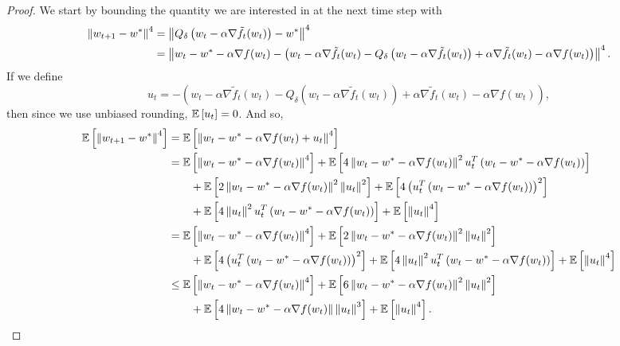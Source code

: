 \begin{proof}
We start by bounding the quantity we are interested in at the next time step with
\begin{align*}
  \left\| w_{t+1} - w^* \right\|^4
  &=
  \left\| Q_{\delta}\left( w_t - \alpha \nabla \tilde f_t(w_t) \right) - w^* \right\|^4 \\
  &=
  \left\| w_t - w^* - \alpha \nabla f(w_t) - \left(
    w_t - \alpha \nabla \tilde f_t(w_t)
    -
    Q_{\delta}\left( w_t - \alpha \nabla \tilde f_t(w_t) \right)
    +
    \alpha \nabla \tilde f_t(w_t)
    -
    \alpha \nabla f(w_t)
  \right)  \right\|^4.
\end{align*}
If we define
\[
  u_t
  =
  -\left(
  w_t - \alpha \nabla \tilde f_t(w_t)
  -
  Q_{\delta}\left( w_t - \alpha \nabla \tilde f_t(w_t) \right)
  +
  \alpha \nabla \tilde f_t(w_t)
  -
  \alpha \nabla f(w_t)\right),
\]
then since we use unbiased rounding, $\mathbb{E}\left[ u_t \right] = 0$.
And so,
\begin{align*}
  \mathbb{E}\left[  \left\| w_{t+1} - w^* \right\|^4  \right]
  &=
  \mathbb{E}\left[  \left\| w_t - w^* - \alpha \nabla f(w_t) + u_t  \right\|^4  \right] \\
  &=
  \mathbb{E}\left[  \left\| w_t - w^* - \alpha \nabla f(w_t)  \right\|^4  \right]
  +
  \mathbb{E}\left[  4 \left\| w_t - w^* - \alpha \nabla f(w_t)  \right\|^2
  u_t^T \left(w_t - w^* - \alpha \nabla f(w_t)\right)  \right]
  \\&\hspace{2em}+
  \mathbb{E}\left[  2 \left\| w_t - w^* - \alpha \nabla f(w_t)  \right\|^2 \left\| u_t \right\|^2  \right]
  +
  \mathbb{E}\left[  4 \left( u_t^T \left(w_t - w^* - \alpha \nabla f(w_t)\right) \right)^2  \right]
  \\&\hspace{2em}+
  \mathbb{E}\left[  4 \left\| u_t \right\|^2 u_t^T \left(w_t - w^* - \alpha \nabla f(w_t)\right)  \right]
  +
  \mathbb{E}\left[  \left\| u_t \right\|^4  \right] \\
  &=
  \mathbb{E}\left[  \left\| w_t - w^* - \alpha \nabla f(w_t)  \right\|^4  \right]
  +
  \mathbb{E}\left[  2 \left\| w_t - w^* - \alpha \nabla f(w_t)  \right\|^2 \left\| u_t \right\|^2  \right]
  \\&\hspace{2em}+
  \mathbb{E}\left[  4 \left( u_t^T \left(w_t - w^* - \alpha \nabla f(w_t)\right) \right)^2  \right]
  +
  \mathbb{E}\left[  4 \left\| u_t \right\|^2 u_t^T \left(w_t - w^* - \alpha \nabla f(w_t)\right)  \right]
  +
  \mathbb{E}\left[  \left\| u_t \right\|^4  \right] \\
  &\le
  \mathbb{E}\left[  \left\| w_t - w^* - \alpha \nabla f(w_t)  \right\|^4  \right]
  +
  \mathbb{E}\left[  6 \left\| w_t - w^* - \alpha \nabla f(w_t)  \right\|^2 \left\| u_t \right\|^2  \right]
  \\&\hspace{2em}+
  \mathbb{E}\left[  4 \left\| w_t - w^* - \alpha \nabla f(w_t)  \right\| \left\| u_t \right\|^3  \right]
  +
  \mathbb{E}\left[  \left\| u_t \right\|^4  \right].
\end{align*}

\end{proof}
